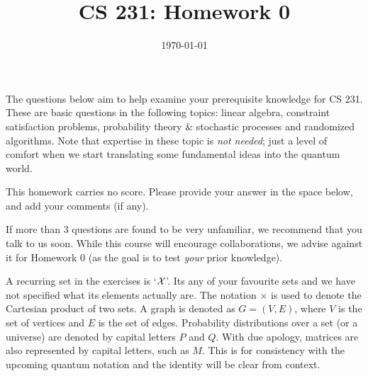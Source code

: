 \documentclass[11pt, svgnames]{article}
\title{CS 231: Homework 0}
\date{\today}
\begin{document}



 The questions below aim to help examine your prerequisite knowledge for CS 231. These are basic questions in the following topics: linear algebra, constraint satisfaction problems, probability theory $\&$ stochastic processes and randomized algorithms. Note that expertise in these topic is \emph{not needed}; just a level of comfort when we start translating some fundamental ideas into the quantum world.   

\vspace{0.1in}

\noindent This homework carries no score. Please provide your answer in the space below, and add your comments (if any).

\vspace{0.1in}

\noindent If more than 3 questions are found to be very unfamiliar, we recommend that you talk to us soon. While this course will encourage collaborations, we advise against it for Homework 0 (as the goal is to test \emph{your} prior knowledge).


\vspace{0.1in}

 A recurring set in the exercises is `$\mathcal{X}$'. Its any of your favourite sets and we have not specified what its elements actually are. The notation $\times$ is used to denote the Cartesian product of two sets. A graph is denoted as $G=(V,E)$, where $V$ is the set of vertices and $E$ is the set of edges. Probability distributions over a set (or a universe) are denoted by capital letters $P$ and $Q$. With due apology, matrices are also represented by capital letters, such as $M$. This is for consistency with the upcoming quantum notation and the identity will be clear from context.    
\end{document}
